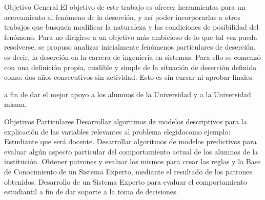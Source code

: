 Objetivo General
El objetivo de este trabajo es ofrecer herramientas para un acercamiento al fenómeno
de la deserción, y así poder incorporarlas a otros trabajos que busquen modificar la
naturaleza y las condiciones de posibilidad del fenómeno. Para no dirigirse a un
objetivo más ambicioso de lo que tal vez pueda resolverse, se propuso analizar
inicialmente fenómenos particulares de deserción, es decir, la deserción en la carrera
de ingeniería en sistemas. Para ello se comenzó con una definición propia, medible y
simple de la situación de deserción definida como: dos años consecutivos sin
actividad. Esto es sin cursar ni aprobar finales.


a fin de dar el mejor apoyo a los alumnos de la Universidad y a la Universidad misma.


Objetivos Particulares
Desarrollar algoritmos de modelos descriptivos para la explicación de las variables relevantes al problema elegidocomo ejemplo: Estudiante que será docente.
Desarrollar algoritmos de modelos predictivos para evaluar algún aspecto particular del comportamiento actual de los
alumnos de la institución.
Obtener patrones y evaluar los mismos para crear las reglas y la Base de Conocimiento de un Sistema Experto,
mediante el resultado de los patrones obtenidos.
Desarrollo de un Sistema Experto para evaluar el comportamiento estudiantil a fin de dar soporte a la toma de
decisiones.


